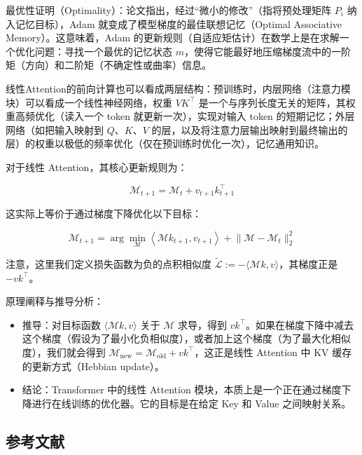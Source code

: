 最优性证明（Optimality）：论文指出，经过``微小的修改''（指将预处理矩阵 \(P_i\) 纳入记忆目标），Adam 就变成了模型梯度的最佳联想记忆（Optimal Associative Memory）。这意味着，Adam 的更新规则（自适应矩估计）在数学上是在求解一个优化问题：寻找一个最优的记忆状态 \(m\)，使得它能最好地压缩梯度流中的一阶矩（方向）和二阶矩（不确定性或曲率）信息。

线性Attention的前向计算也可以看成两层结构：预训练时，内层网络（注意力模块）可以看成一个线性神经网络，权重 \(VK^\top\) 是一个与序列长度无关的矩阵，其权重高频优化（读入一个 token 就更新一次），实现对输入 token 的短期记忆；外层网络（如把输入映射到 \(Q\)、\(K\)、\(V\) 的层，以及将注意力层输出映射到最终输出的层）的权重以极低的频率优化（仅在预训练时优化一次），记忆通用知识。

对于线性 Attention，其核心更新规则为：

\[
\mathcal{M}_{t+1}=\mathcal{M}_t+v_{t+1}k_{t+1}^\top
\tag{16}
\]

这实际上等价于通过梯度下降优化以下目标：

\[
\mathcal{M}_{t+1}=\arg\min_{\mathcal{M}}\left\langle \mathcal{M}k_{t+1},v_{t+1}\right\rangle+\lVert \mathcal{M}-\mathcal{M}_t\rVert_2^2
\tag{15}
\]

注意，这里我们定义损失函数为负的点积相似度 \(\tilde{\mathcal{L}}:=-\langle \mathcal{M}k,v\rangle\)，其梯度正是 \(-vk^\top\)。

原理阐释与推导分析：

\begin{itemize}
\tightlist
\item
  推导：对目标函数 \(\langle \mathcal{M}k,v\rangle\) 关于 \(\mathcal{M}\) 求导，得到 \(vk^\top\)。如果在梯度下降中减去这个梯度（假设为了最小化负相似度），或者加上这个梯度（为了最大化相似度），我们就会得到 \(\mathcal{M}_{\mathrm{new}}=\mathcal{M}_{\mathrm{old}}+vk^\top\)，这正是线性 Attention 中 KV 缓存的更新方式（Hebbian update）。
\item
  结论：Transformer 中的线性 Attention 模块，本质上是一个正在通过梯度下降进行在线训练的优化器。它的目标是在给定 Key 和 Value 之间映射关系。
\end{itemize}

\hypertarget{ux53c2ux8003ux6587ux732e-72}{%
\subsection{参考文献}\label{ux53c2ux8003ux6587ux732e-72}}

